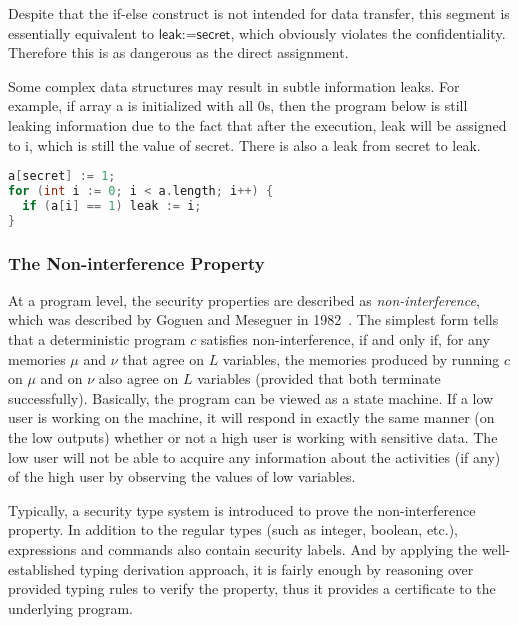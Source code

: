 Despite that the \textsf{if-else} construct is not intended for data transfer, this segment is essentially equivalent to $\textsf{leak:=secret}$, which obviously violates the confidentiality. Therefore this is as dangerous as the direct assignment.

Some complex data structures may result in subtle information leaks. For example, if array \textsf{a} is initialized with all \textsf{0}s, then the program below is still leaking information due to the fact that after the execution, \textsf{leak} will be assigned to \textsf{i}, which is still the value of \textsf{secret}. There is also a leak from \textsf{secret} to \textsf{leak}.

\begin{lstlisting}[language=c]
a[secret] := 1;
for (int i := 0; i < a.length; i++) {
  if (a[i] == 1) leak := i;
}
\end{lstlisting}

\subsubsection{The Non-interference Property}
At a program level, the security properties are described as \emph{non-interference}, which was described by Goguen and Meseguer in 1982~\cite{Goguen:1982ta}. The simplest form tells that a deterministic program $c$ satisfies non-interference, if and only if, for any memories $\mu$ and $\nu$ that agree on $L$ variables, the memories produced by running $c$ on $\mu$ and on $\nu$ also agree on $L$ variables (provided that both terminate successfully). Basically, the program can be viewed as a state machine. If a low user is working on the machine, it will respond in exactly the same manner (on the low outputs) whether or not a high user is working with sensitive data. The low user will not be able to acquire any information about the activities (if any) of the high user by observing the values of low variables.

Typically, a security type system is introduced to prove the non-interference property. In addition to the regular types (such as integer, boolean, etc.), expressions and commands also contain security labels. And by applying the well-established typing derivation approach, it is fairly enough by reasoning over provided typing rules to verify the property, thus it provides a certificate to the underlying program.


